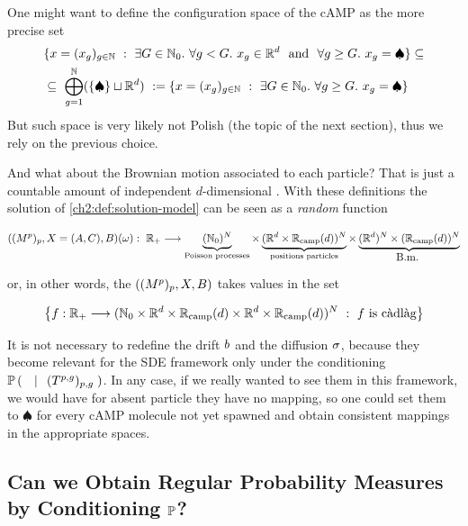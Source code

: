 \begin{remark}
	One might want to define the configuration space of the cAMP as the more precise set
	\begin{align*}
		&\{
		x = (x_g)_{g\in\N}\
		:\
		\exists G\in\N_0.\
		\forall g < G.\
		x_g \in \R^d\
		\text{ and }\
		\forall g\geq G.\
		x_g =\spadesuit
		\}\subseteq
		\\
		&\subseteq\
		\bigoplus_{g=1}^\N (\{\spadesuit\} \sqcup \R^d)\
		:=
		\{
		x = (x_g)_{g\in\N}\
		:\
		\exists G\in\N_0.\
		\forall g\geq G.\
		x_g =\spadesuit
		\}
	\end{align*}
	But such space is very likely not Polish (the topic of the next section), thus we rely on the previous choice.
\end{remark}

And what about the Brownian motion associated to each particle? That is just a countable amount of independent $d$-dimensional \Bm.
With these definitions the solution of \ref{ch2:def:solution-model} can be seen as a \emph{random \cadlag} function 

\begin{equation*}
	((\hmactive^p)_p, \sol = (\amba, \camp), B) (\omega):\
	\R_+ \longrightarrow 
	\underbrace{
		(\N_0)^N
	}_{\text{Poisson processes}}
	\times
	\underbrace{
		(\R^d\times\confCamp(d))^N 
	}_{ \text{positions particles}}
		\times 
	\underbrace{
		(\R^d)^N \times (\confCamp(d))^N
	}_{\Bm}
\end{equation*}

or, in other words, the \rv $((\hmactive^p)_p, \sol, B)$ takes values in the set

\begin{equation}\label{app:def:space-of-solutions}
	\left\{
		f:\R_+ \longrightarrow 
			(\N_0
			\times
			\R^d\times\confCamp(d)
			\times 
			\R^d \times \confCamp(d))^N\
			:\
			f \text{ is \cadlag}
	\right\}
\end{equation}

It is not necessary to redefine the drift $\drift$ and the diffusion $\diffusion$, because they become relevant for the SDE framework only under the conditioning $\PrbCondTimes{}{}$. In any case, if we really wanted to see them in this framework, we would have for absent particle they have no mapping, so one could set them to  $\spadesuit$ for every cAMP molecule not yet spawned and obtain consistent mappings in the appropriate spaces.

\subsection{Can we Obtain Regular Probability Measures by Conditioning $\Prb$?}

